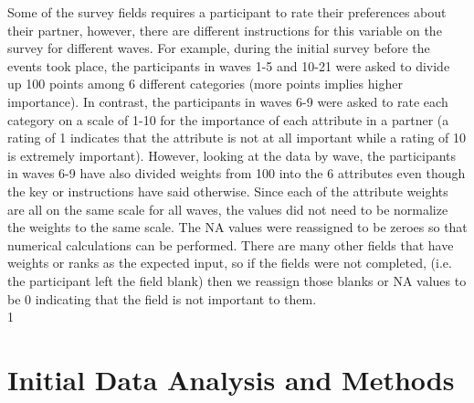 \documentclass{article}
\begin{document}
Some of the survey fields requires a participant to rate their preferences about their partner, however, there are different instructions for this variable on the survey for different waves.  For example, during the initial survey before the events took place, the participants in waves 1-5 and 10-21 were asked to divide up 100 points among 6 different categories (more points implies higher importance).  In contrast, the participants in waves 6-9 were asked to rate each category on a scale of 1-10 for the importance of each attribute in a partner (a rating of 1 indicates that the attribute is not at all important while a rating of 10 is extremely important).  However, looking at the data by wave, the participants in waves 6-9 have also divided weights from 100 into the 6 attributes even though the key or instructions have said otherwise. Since each of the attribute weights are all on the same scale for all waves, the values did not need to be normalize the weights to the same scale.  The NA values were reassigned to be zeroes so that numerical calculations can be performed.  There are many other fields that have weights or ranks as the expected input, so if the fields were not completed, (i.e. the participant left the field blank) then we reassign those blanks or NA values to be 0 indicating that the field is not important to them.\\


1%

\section{Initial Data Analysis and Methods}
\end{document}
